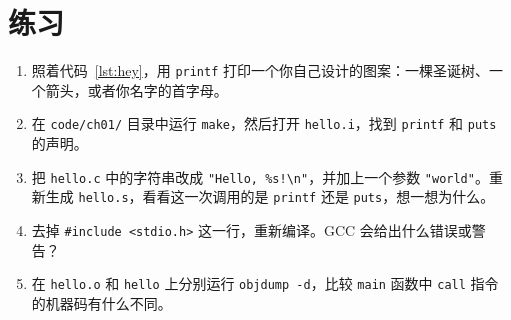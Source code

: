 \section*{练习}

\begin{enumerate}
  \item 照着代码~\ref{lst:hey}，用 \texttt{printf} 打印一个你自己设计的图案：一棵圣诞树、一个箭头，或者你名字的首字母。
  \item 在 \texttt{code/ch01/} 目录中运行 \texttt{make}，然后打开 \texttt{hello.i}，找到 \texttt{printf} 和 \texttt{puts} 的声明。
  \item 把 \texttt{hello.c} 中的字符串改成 \texttt{"Hello, \%s!\textbackslash n"}，并加上一个参数 \texttt{"world"}。重新生成 \texttt{hello.s}，看看这一次调用的是 \texttt{printf} 还是 \texttt{puts}，想一想为什么。
  \item 去掉 \texttt{\#include <stdio.h>} 这一行，重新编译。GCC 会给出什么错误或警告？
  \item 在 \texttt{hello.o} 和 \texttt{hello} 上分别运行 \texttt{objdump -d}，比较 \texttt{main} 函数中 \texttt{call} 指令的机器码有什么不同。
\end{enumerate}
